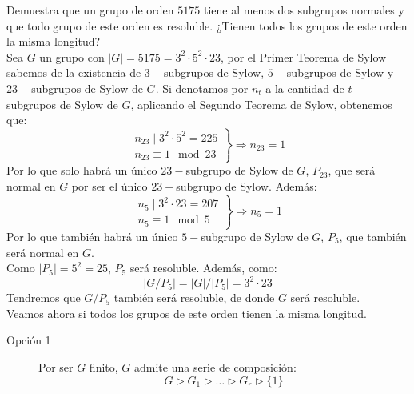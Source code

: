 \documentclass[12pt]{article}
\begin{document}
    \begin{ejercicio}[2.5 puntos]
        Demuestra que un grupo de orden $5175$ tiene al menos dos subgrupos normales y que todo grupo de este orden es resoluble. ¿Tienen todos los grupos de este orden la misma longitud?\\

        \noindent
        Sea $G$ un grupo con $|G| = 5175 = 3^2 \cdot 5^2 \cdot 23$, por el Primer Teorema de Sylow sabemos de la existencia de $3-$subgrupos de Sylow, $5-$subgrupos de Sylow y $23-$subgrupos de Sylow de $G$. Si denotamos por $n_t$ a la cantidad de $t-$subgrupos de Sylow de $G$, aplicando el Segundo Teorema de Sylow, obtenemos que:
        \begin{equation*}
            \left.\begin{array}{r}
                n_{23} \mid 3^2 \cdot 5^2 = 225 \\
                n_{23} \equiv 1 \mod 23
            \end{array}\right\} \Longrightarrow n_{23} = 1
        \end{equation*}
        Por lo que solo habrá un único $23-$subgrupo de Sylow de $G$, $P_{23}$, que será normal en $G$ por ser el único $23-$subgrupo de Sylow. Además:
        \begin{equation*}
            \left.\begin{array}{r}
                n_5 \mid 3^2 \cdot 23 = 207 \\
                n_5 \equiv 1 \mod 5
            \end{array}\right\} \Longrightarrow n_5 = 1
        \end{equation*}
        Por lo que también habrá un único $5-$subgrupo de Sylow de $G$, $P_5$, que también será normal en $G$.\\

        \noindent
        Como $|P_5| = 5^2 = 25$, $P_5$ será resoluble. Además, como:
        \begin{equation*}
            |G/P_5| = |G|/|P_5| = 3^2\cdot 23
        \end{equation*}
        Tendremos que $G/P_5$ también será resoluble, de donde $G$ será resoluble.\\

        \noindent
        Veamos ahora si todos los grupos de este orden tienen la misma longitud.
        \begin{description}
            \item[Opción 1] Por ser $G$ finito, $G$ admite una serie de composición:
            \begin{equation*}
                G \rhd G_1 \rhd \ldots \rhd G_r \rhd \{1\}
            \end{equation*}


\end{description}
\end{ejercicio}
\end{document}

